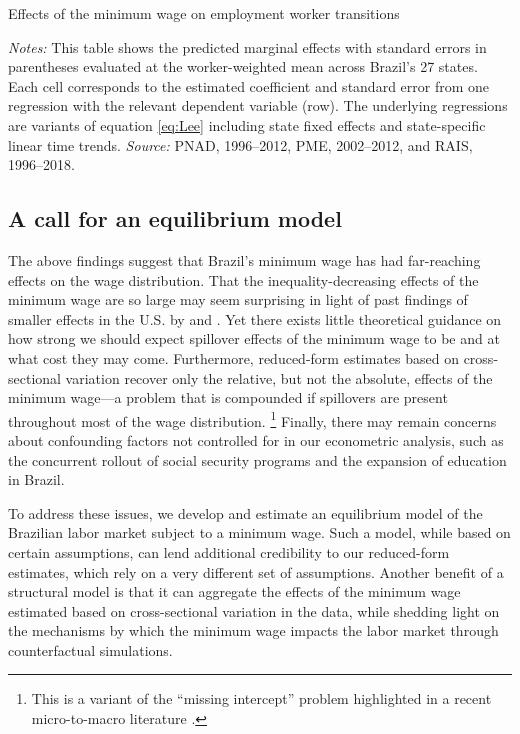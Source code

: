 \begin{table}[!htb]
  \centering
  \caption{\label{tab:employment_effects}Effects of the minimum wage on employment worker transitions}
  \pretabvspace
  
  \posttabvspace
  \begin{minipage}[t]{1\columnwidth}%
    \begin{spacing}{0.75}
      \emph{\scriptsize{}Notes:}{\scriptsize{} This table shows the predicted marginal
      effects with standard errors in parentheses evaluated at the worker-weighted
      mean across Brazil's 27 states. Each cell corresponds to the estimated coefficient and standard error from one regression with the relevant dependent variable (row). The underlying regressions are variants of equation \eqref{eq:Lee} including state fixed effects and state-specific linear time trends. %
      \emph{\scriptsize{}Source: } PNAD, 1996--2012, PME, 2002--2012, and RAIS, 1996--2018.}
    \end{spacing}
  \end{minipage}
\end{table}




\subsection{A call for an equilibrium model\label{subsec:data_to_model}}

The above findings suggest that Brazil's minimum wage has had far-reaching effects on the wage distribution. That the inequality-decreasing effects of the minimum wage are so large may seem surprising in light of past findings of smaller effects in the U.S. by \citet{Lee1999} and \citet{Autor2016}. Yet there exists little theoretical guidance on how strong we should expect spillover effects of the minimum wage to be and at what cost they may come. Furthermore, reduced-form estimates based on cross-sectional variation recover only the relative, but not the absolute, effects of the minimum wage---a problem that is compounded if spillovers are present throughout most of the wage distribution.%
%
\footnote{This is a variant of the ``missing intercept'' problem highlighted in a recent micro-to-macro literature \citep{NakamuraSteinsson2018}.} %
%
Finally, there may remain concerns about confounding factors not controlled for in our econometric analysis, such as the concurrent rollout of social security programs and the expansion of education in Brazil.

To address these issues, we develop and estimate an equilibrium model of the Brazilian labor market subject to a minimum wage. Such a model, while based on certain assumptions, can lend additional credibility to our reduced-form estimates, which rely on a very different set of assumptions. Another benefit of a structural model is that it can aggregate the effects of the minimum wage estimated based on cross-sectional variation in the data, while shedding light on the mechanisms by which the minimum wage impacts the labor market through counterfactual simulations.
